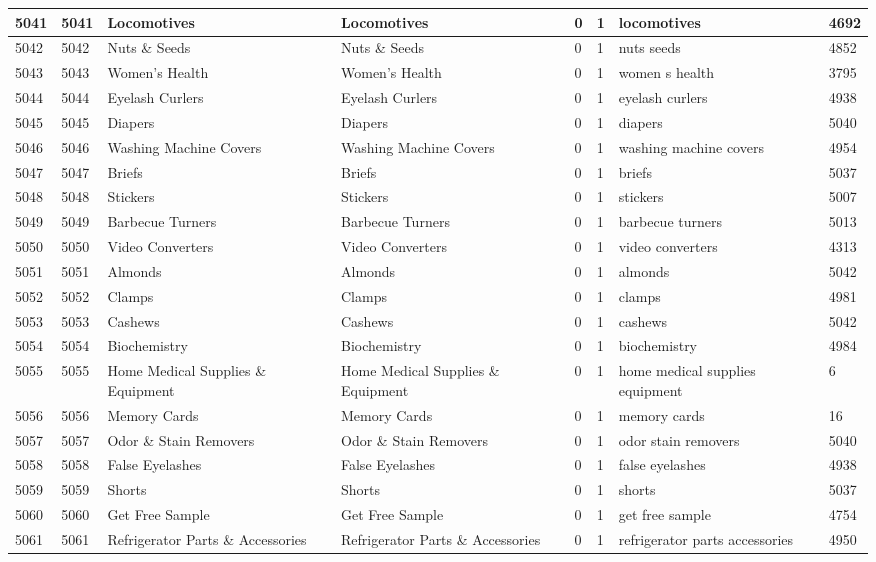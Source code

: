 \begin{longtable}{|l|l|l|l|l|l|l|l|}
5041 & 5041 & Locomotives & Locomotives & 0 & 1 & locomotives & 4692 \\ \hline 
5042 & 5042 & Nuts \& Seeds & Nuts \& Seeds & 0 & 1 & nuts seeds & 4852 \\ \hline 
5043 & 5043 & Women's Health & Women's Health & 0 & 1 & women s health & 3795 \\ \hline 
5044 & 5044 & Eyelash Curlers & Eyelash Curlers & 0 & 1 & eyelash curlers & 4938 \\ \hline 
5045 & 5045 & Diapers & Diapers & 0 & 1 & diapers & 5040 \\ \hline 
5046 & 5046 & Washing Machine Covers & Washing Machine Covers & 0 & 1 & washing machine covers & 4954 \\ \hline 
5047 & 5047 & Briefs & Briefs & 0 & 1 & briefs & 5037 \\ \hline 
5048 & 5048 & Stickers & Stickers & 0 & 1 & stickers & 5007 \\ \hline 
5049 & 5049 & Barbecue Turners & Barbecue Turners & 0 & 1 & barbecue turners & 5013 \\ \hline 
5050 & 5050 & Video Converters & Video Converters & 0 & 1 & video converters & 4313 \\ \hline 
5051 & 5051 & Almonds & Almonds & 0 & 1 & almonds & 5042 \\ \hline 
5052 & 5052 & Clamps & Clamps & 0 & 1 & clamps & 4981 \\ \hline 
5053 & 5053 & Cashews & Cashews & 0 & 1 & cashews & 5042 \\ \hline 
5054 & 5054 & Biochemistry & Biochemistry & 0 & 1 & biochemistry & 4984 \\ \hline 
5055 & 5055 & Home Medical Supplies \& Equipment & Home Medical Supplies \& Equipment & 0 & 1 & home medical supplies equipment & 6 \\ \hline 
5056 & 5056 & Memory Cards & Memory Cards & 0 & 1 & memory cards & 16 \\ \hline 
5057 & 5057 & Odor \& Stain Removers & Odor \& Stain Removers & 0 & 1 & odor stain removers & 5040 \\ \hline 
5058 & 5058 & False Eyelashes & False Eyelashes & 0 & 1 & false eyelashes & 4938 \\ \hline 
5059 & 5059 & Shorts & Shorts & 0 & 1 & shorts & 5037 \\ \hline 
5060 & 5060 & Get Free Sample & Get Free Sample & 0 & 1 & get free sample & 4754 \\ \hline 
5061 & 5061 & Refrigerator Parts \& Accessories & Refrigerator Parts \& Accessories & 0 & 1 & refrigerator parts accessories & 4950 \\ \hline 

\end{longtable}
